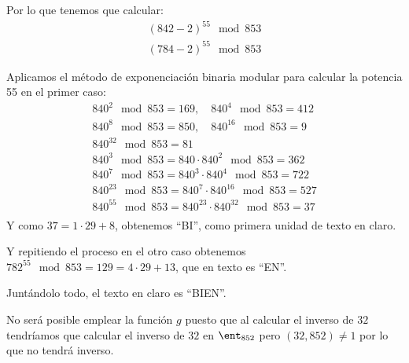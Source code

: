 \begin{problem}[7]
Por lo que tenemos que calcular:
\begin{gather*}
(842-2)^{55} \mod 853\\
(784-2)^{55} \mod 853
\end{gather*}

Aplicamos el método de exponenciación binaria modular para calcular la potencia 55 en el primer caso:
\begin{gather*}
840^{2} \mod 853 = 169, \quad 840^{4} \mod 853 = 412\\
840^{8} \mod 853 = 850, \quad 840^{16} \mod 853 = 9\\
840^{32} \mod 853 = 81\\
840^{3} \mod 853 = 840 \cdot 840^{2} \mod 853 = 362\\
840^{7} \mod 853 = 840^{3} \cdot 840^{4} \mod 853 = 722\\
840^{23} \mod 853 = 840^{7} \cdot 840^{16} \mod 853 = 527\\
840^{55} \mod 853 = 840^{23} \cdot 840^{32} \mod 853 = 37\\
\end{gather*}
Y como $37 = 1 \cdot 29 + 8$, obtenemos ``BI'', como primera unidad de texto en claro.

Y repitiendo el proceso en el otro caso obtenemos $782^{55} \mod 853 = 129 = {4 \cdot 29 + 13}$, que en texto es ``EN''.

Juntándolo todo, el texto en claro es ``BIEN''.

\spart

No será posible emplear la función $g$ puesto que al calcular el inverso de $32$ tendríamos que calcular el inverso de $32$ en $\ent_{852}$ pero $(32,852) \neq 1$ por lo que no tendrá inverso.
\end{problem}





